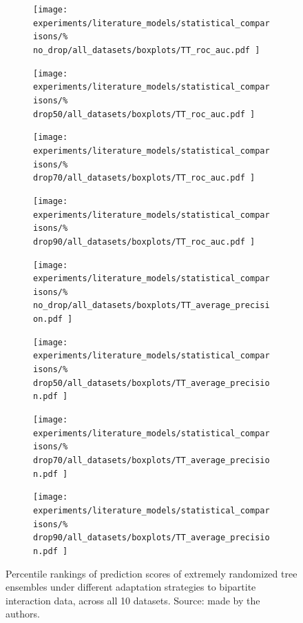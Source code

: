 \begin{figure}[tb]
    \begin{subfigure}{0.24\textwidth}
        \texttt{[image: 
            experiments/literature\_models/statistical\_comparisons/\%
            no\_drop/all\_datasets/boxplots/TT\_roc\_auc.pdf
        ]}
    \end{subfigure}
    \begin{subfigure}{0.24\textwidth}
        \texttt{[image: 
            experiments/literature\_models/statistical\_comparisons/\%
            drop50/all\_datasets/boxplots/TT\_roc\_auc.pdf
        ]}
    \end{subfigure}
    \begin{subfigure}{0.24\textwidth}
        \texttt{[image: 
            experiments/literature\_models/statistical\_comparisons/\%
            drop70/all\_datasets/boxplots/TT\_roc\_auc.pdf
        ]}
    \end{subfigure}
    \begin{subfigure}{0.24\textwidth}
        \texttt{[image: 
            experiments/literature\_models/statistical\_comparisons/\%
            drop90/all\_datasets/boxplots/TT\_roc\_auc.pdf
        ]}
    \end{subfigure}

    \begin{subfigure}{0.24\textwidth}
        \texttt{[image: 
            experiments/literature\_models/statistical\_comparisons/\%
            no\_drop/all\_datasets/boxplots/TT\_average\_precision.pdf
        ]}
    \end{subfigure}
    \begin{subfigure}{0.24\textwidth}
        \texttt{[image: 
            experiments/literature\_models/statistical\_comparisons/\%
            drop50/all\_datasets/boxplots/TT\_average\_precision.pdf
        ]}
    \end{subfigure}
    \begin{subfigure}{0.24\textwidth}
        \texttt{[image: 
            experiments/literature\_models/statistical\_comparisons/\%
            drop70/all\_datasets/boxplots/TT\_average\_precision.pdf
        ]}
    \end{subfigure}
    \begin{subfigure}{0.24\textwidth}
        \texttt{[image: 
            experiments/literature\_models/statistical\_comparisons/\%
            drop90/all\_datasets/boxplots/TT\_average\_precision.pdf
        ]}
    \end{subfigure}
    \caption{
        Percentile rankings of prediction scores of extremely randomized tree ensembles under different adaptation strategies to bipartite interaction data, across all 10 datasets. Source: made by the authors.
    }
    \label{fig:comparison literature}
\end{figure}


